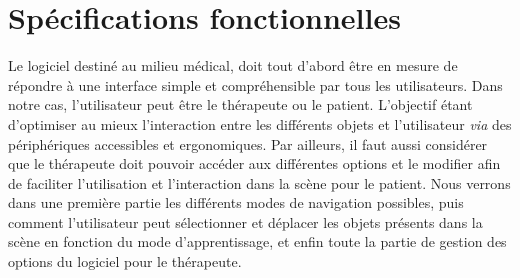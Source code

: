 \section{Spécifications fonctionnelles}

Le logiciel destiné au milieu médical, doit tout d'abord être en mesure de répondre à une interface simple et compréhensible par tous les utilisateurs. Dans notre cas, l'utilisateur peut être le thérapeute ou le patient. L'objectif étant d'optimiser au mieux l'interaction entre les différents objets et l'utilisateur \textit{via} des périphériques accessibles et ergonomiques. Par ailleurs, il faut aussi considérer que le thérapeute doit pouvoir accéder aux différentes options et le modifier afin de faciliter l'utilisation et l’interaction dans la scène pour le patient.
\newline
Nous verrons dans une première partie les différents modes de navigation possibles, puis comment l'utilisateur peut sélectionner et déplacer les objets présents dans la scène en fonction du mode d'apprentissage, et enfin toute la partie de gestion des options du logiciel pour le thérapeute.


